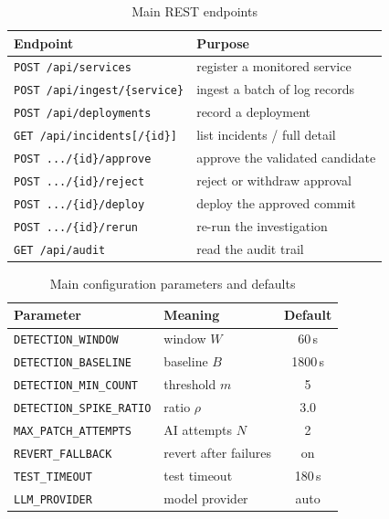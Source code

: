 \documentclass[conference]{IEEEtran}
\begin{document}
\begin{table}[t]
\centering
\caption{Main REST endpoints}
\label{tab:api}
\footnotesize
\begin{tabular}{@{}p{4.2cm}p{3.5cm}@{}}
\toprule
Endpoint & Purpose \\
\midrule
\texttt{POST /api/services} & register a monitored service \\
\texttt{POST /api/ingest/\{service\}} & ingest a batch of log records \\
\texttt{POST /api/deployments} & record a deployment \\
\texttt{GET /api/incidents[/\{id\}]} & list incidents / full detail \\
\texttt{POST .../\{id\}/approve} & approve the validated candidate \\
\texttt{POST .../\{id\}/reject} & reject or withdraw approval \\
\texttt{POST .../\{id\}/deploy} & deploy the approved commit \\
\texttt{POST .../\{id\}/rerun} & re-run the investigation \\
\texttt{GET /api/audit} & read the audit trail \\
\bottomrule
\end{tabular}
\end{table}

\begin{table}[t]
\centering
\caption{Main configuration parameters and defaults}
\label{tab:config}
\footnotesize
\begin{tabular}{@{}p{3.8cm}p{2.3cm}c@{}}
\toprule
Parameter & Meaning & Default \\
\midrule
\texttt{DETECTION\_WINDOW} & window $W$ & 60\,s \\
\texttt{DETECTION\_BASELINE} & baseline $B$ & 1800\,s \\
\texttt{DETECTION\_MIN\_COUNT} & threshold $m$ & 5 \\
\texttt{DETECTION\_SPIKE\_RATIO} & ratio $\rho$ & 3.0 \\
\texttt{MAX\_PATCH\_ATTEMPTS} & AI attempts $N$ & 2 \\
\texttt{REVERT\_FALLBACK} & revert after failures & on \\
\texttt{TEST\_TIMEOUT} & test timeout & 180\,s \\
\texttt{LLM\_PROVIDER} & model provider & auto \\
\bottomrule
\end{tabular}
\end{table}
\end{document}
